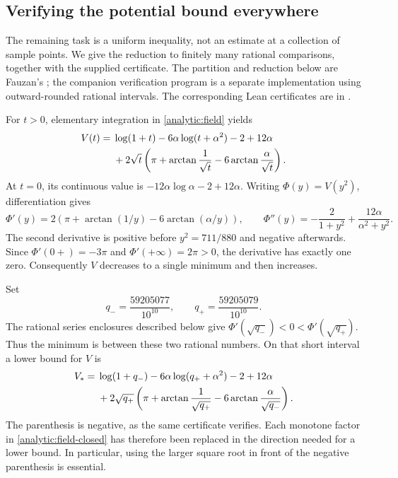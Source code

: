 \subsection{Verifying the potential bound everywhere}
\label{analytic:certificate}

The remaining task is a uniform inequality, not an estimate at a
collection of sample points. We give the reduction to finitely many
rational comparisons, together with the supplied certificate.
The partition and reduction below are Fauzan's
\cite[Appendix A.2--A.3, Table 2]{fauzan};
the companion verification program is a separate implementation using
outward-rounded rational intervals. The corresponding Lean certificates
are in \cite[\texttt{Apery/TableCheck.lean},
\texttt{Apery/Table/}]{firsching}.

For \(t>0\), elementary integration in \eqref{analytic:field} yields
\begin{align}
 V(t)={}&\log(1+t)-6\alpha\log(t+\alpha^2)-2+12\alpha \notag\\
       &+2\sqrt t\left(\pi+\arctan\frac1{\sqrt t}
                               -6\arctan\frac{\alpha}{\sqrt t}\right).
 \label{analytic:field-closed}
\end{align}
At \(t=0\), its continuous value is
\(-12\alpha\log\alpha-2+12\alpha\).
Writing \(\Phi(y)=V(y^2)\), differentiation gives
\[
 \Phi'(y)=2\left(\pi+\arctan(1/y)-6\arctan(\alpha/y)\right),
 \qquad
 \Phi''(y)=-\frac2{1+y^2}+\frac{12\alpha}{\alpha^2+y^2}.
\]
The second derivative is positive before \(y^2=711/880\) and negative
afterwards. Since \(\Phi'(0+)=-3\pi\) and
\(\Phi'(+\infty)=2\pi>0\), the derivative has exactly one zero.
Consequently \(V\) decreases to a single minimum and then increases.

Set
\[
 q_-=\frac{59205077}{10^{10}},\qquad
 q_+=\frac{59205079}{10^{10}}.
\]
The rational series enclosures described below give
\(\Phi'(\sqrt{q_-})<0<\Phi'(\sqrt{q_+})\).
Thus the minimum is between these two rational numbers. On that
short interval a lower bound for \(V\) is
\begin{align}
 V_*={}&\log(1+q_-)-6\alpha\log(q_++\alpha^2)-2+12\alpha\notag\\
 &+2\sqrt{q_+}\left(\pi+\arctan\frac1{\sqrt{q_+}}
                         -6\arctan\frac{\alpha}{\sqrt{q_-}}\right).
 \label{analytic:vstar}
\end{align}
The parenthesis is negative, as the same certificate verifies.
Each monotone factor in \eqref{analytic:field-closed} has therefore
been replaced in the direction needed for a lower bound. In particular,
using the larger square root in front of the negative parenthesis is
essential.

